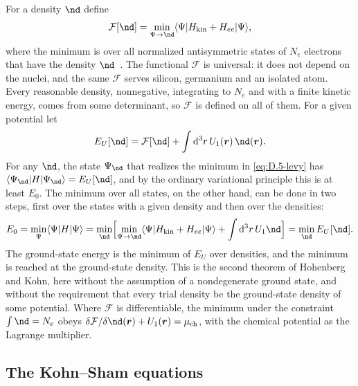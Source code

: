 For a density $\nd$ define
\begin{equation}
  \mathcal{F}[\nd] = \min_{\Psi\to\nd}\langle\Psi|H_{\mathrm{kin}} + H_{ee}|\Psi\rangle ,
  \label{eq:D.5-levy}
\end{equation}
where the minimum is over all normalized antisymmetric states of $N_e$ electrons that have the density $\nd$~\cite{levy1979universal}. The functional $\mathcal{F}$ is universal: it does not depend on the nuclei, and the same $\mathcal{F}$ serves silicon, germanium and an isolated atom. Every reasonable density, nonnegative, integrating to $N_e$ and with a finite kinetic energy, comes from some determinant, so $\mathcal{F}$ is defined on all of them. For a given potential let
\begin{equation*}
  E_{U}[\nd] = \mathcal{F}[\nd] + \int\dd^3r\,U_1(\vect{r})\,\nd(\vect{r}) .
\end{equation*}
For any $\nd$, the state $\Psi_{\nd}$ that realizes the minimum in \cref{eq:D.5-levy} has $\langle\Psi_{\nd}|H|\Psi_{\nd}\rangle = E_U[\nd]$, and by the ordinary variational principle this is at least $E_0$. The minimum over all states, on the other hand, can be done in two steps, first over the states with a given density and then over the densities:
\begin{equation*}
  E_0 = \min_\Psi\langle\Psi|H|\Psi\rangle = \min_{\nd}\Bigl[\min_{\Psi\to\nd}\langle\Psi|H_{\mathrm{kin}} + H_{ee}|\Psi\rangle + \int\dd^3r\,U_1\nd\Bigr] = \min_{\nd}E_U[\nd] .
\end{equation*}
The ground-state energy is the minimum of $E_U$ over densities, and the minimum is reached at the ground-state density. This is the second theorem of Hohenberg and Kohn, here without the assumption of a nondegenerate ground state, and without the requirement that every trial density be the ground-state density of some potential. Where $\mathcal{F}$ is differentiable, the minimum under the constraint $\int\nd = N_e$ obeys $\delta\mathcal{F}/\delta\nd(\vect{r}) + U_1(\vect{r}) = \mu_{\mathrm{ch}}$, with the chemical potential as the Lagrange multiplier.

\subsection*{The Kohn--Sham equations}

